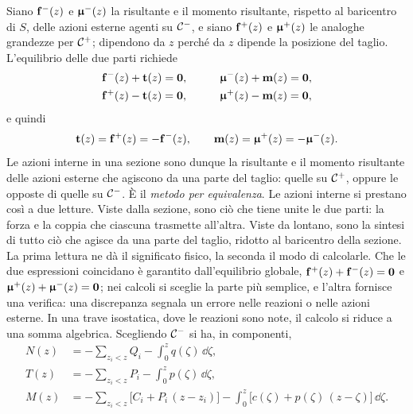 Siano $\mathbf{f}^-(z)$ e $\bm{\upmu}^-(z)$ la risultante e il
momento risultante, rispetto al baricentro di $S$, delle
azioni esterne agenti su $\mathcal{C}^-$, e siano $\mathbf{f}^+(z)$ e
$\bm{\upmu}^+(z)$ le analoghe grandezze per $\mathcal{C}^+$; dipendono
da $z$ perché da $z$ dipende la posizione del taglio.
L'equilibrio delle due parti richiede
\begin{alignat*}{2}
	&\mathbf{f}^-(z) + \mathbf{t}(z) = \mathbf{0}, &\qquad
	&\bm{\upmu}^-(z) + \mathbf{m}(z) = \mathbf{0},\\
	&\mathbf{f}^+(z) - \mathbf{t}(z) = \mathbf{0}, &\qquad
	&\bm{\upmu}^+(z) - \mathbf{m}(z) = \mathbf{0},
\end{alignat*}
e quindi
\begin{equation}\label{eq:NTM_def}
	\mathbf{t}(z) = \mathbf{f}^+(z) = -\mathbf{f}^-(z), \qquad
	\mathbf{m}(z) = \bm{\upmu}^+(z) = -\bm{\upmu}^-(z).
\end{equation}
Le azioni interne in una sezione sono dunque la risultante
e il momento risultante delle azioni esterne che agiscono
da una parte del taglio: quelle su $\mathcal{C}^+$, oppure le
opposte di quelle su $\mathcal{C}^-$. È il \emph{metodo per
	equivalenza}.
Le azioni interne si prestano così a due letture. Viste
dalla sezione, sono ciò che tiene unite le due parti: la
forza e la coppia che ciascuna trasmette all'altra. Viste
da lontano, sono la sintesi di tutto ciò che agisce da
una parte del taglio, ridotto al baricentro della
sezione. La prima lettura ne dà il significato fisico,
la seconda il modo di calcolarle.
Che le due espressioni coincidano è garantito
dall'equilibrio globale, $\mathbf{f}^+(z) + \mathbf{f}^-(z) = \mathbf{0}$
e $\bm{\upmu}^+(z) + \bm{\upmu}^-(z) = \mathbf{0}$; nei calcoli si sceglie la
parte più semplice, e l'altra fornisce una verifica: una
discrepanza segnala un errore nelle reazioni o nelle
azioni esterne. In una trave isostatica, dove le reazioni
sono note, il calcolo si riduce a una somma algebrica.
Scegliendo $\mathcal{C}^-$ si ha, in componenti,
\begin{equation}\label{eq:NTM_esplicite}
	\begin{aligned}
		N(z) &= -\sum_{z_i < z} Q_i - \int_0^z q(\zeta)\,\dd\zeta,\\
		T(z) &= -\sum_{z_i < z} P_i - \int_0^z p(\zeta)\,\dd\zeta,\\
		M(z) &= -\sum_{z_i < z} \bigl[C_i + P_i\,(z - z_i)\bigr]
		- \int_0^z \bigl[c(\zeta) + p(\zeta)\,(z - \zeta)\bigr]\,\dd\zeta.
	\end{aligned}
\end{equation}

